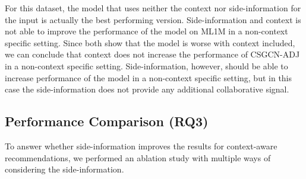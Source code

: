 For this dataset, the model that uses neither the context nor side-information for the input is actually the best performing version.
Side-information and context is not able to improve the performance of the model on ML1M in a non-context specific setting.
Since both  show that the model is worse with context included, we can conclude that context does not increase the performance of CSGCN-ADJ in a non-context specific setting.
Side-information, however, should be able to increase performance of the model in a non-context specific setting, but in this case the side-information does not provide any additional collaborative signal.

\subsection{Performance Comparison (RQ3)}
To answer whether side-information improves the results for context-aware recommendations, we performed an ablation study with multiple ways of considering the side-information.

